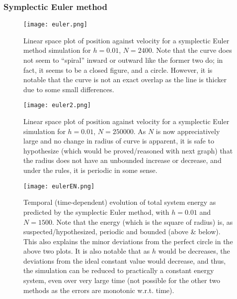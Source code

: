 \documentclass{report}
\begin{document}
\subsubsection*{Symplectic Euler method}
\begin{figure}[H]
	\centering
	\texttt{[image: euler.png]}
	\label{eulerphase}
	\caption{Linear space plot of position against velocity for a symplectic Euler method simulation for $h=0.01$, $N=2400$. Note that the curve does not seem to ``spiral'' inward or outward like the former two do; in fact, it seems to be a closed figure, and a circle. However, it is notable that the curve is not an exact overlap as the line is thicker due to some small differences.}
\end{figure}
\begin{figure}[H]
	\centering
	\texttt{[image: euler2.png]}
	\label{eulermag}
	\caption{Linear space plot of position against velocity for a symplectic Euler simulation for $h=0.01$, $N= 250000$. As $N$ is now appreciatively large and no change in radius of curve is apparent, it is safe to hypothesize (which would be proved/reasoned with next graph) that the radius does not have an unbounded increase or decrease, and under the rules, it is periodic in some sense.}
\end{figure}
\begin{figure}[H]
	\centering
	\texttt{[image: eulerEN.png]}
	\label{eulerenergy}
	\caption{Temporal (time-dependent) evolution of total system energy as predicted by the symplectic Euler method, with $h=0.01$ and $N=1500$. Note that the energy (which is the square of radius) is, as suspected/hypothesized, periodic and bounded (above \& below). This also explains the minor deviations from the perfect circle in the above two plots. It is also notable that as $h$ would be decreases, the deviations from the ideal constant value would decrease, and thus, the simulation can be reduced to practically a constant energy system, even over very large time (not possible for the other two methods as the errors are monotonic w.r.t. time).}
\end{figure}
\end{document}
